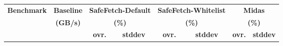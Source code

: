 \begin{tabular}{l|r|rr|rr|rr}
\multirow{3}{*}{\textbf{Benchmark}} &\multicolumn{1}{c|}{\textbf{Baseline}}& \multicolumn{2}{c|}{\textbf{SafeFetch-Default}}& \multicolumn{2}{c|}{\textbf{SafeFetch-Whitelist}}& \multicolumn{2}{c|}{\textbf{Midas}}\\
&\multicolumn{1}{c|}{\textbf{(GB/s)}}& \multicolumn{2}{c|}{\textbf{(\%)}}& \multicolumn{2}{c|}{\textbf{(\%)}}& \multicolumn{2}{c|}{\textbf{(\%)}}\\
&&\multicolumn{1}{c}{\textbf{ovr.}}&\multicolumn{1}{c|}{\textbf{stddev}}&\multicolumn{1}{c}{\textbf{ovr.}}&\multicolumn{1}{c|}{\textbf{stddev}}&\multicolumn{1}{c}{\textbf{ovr.}}&\multicolumn{1}{c|}{\textbf{stddev}}\\
\hline
\end{tabular}
